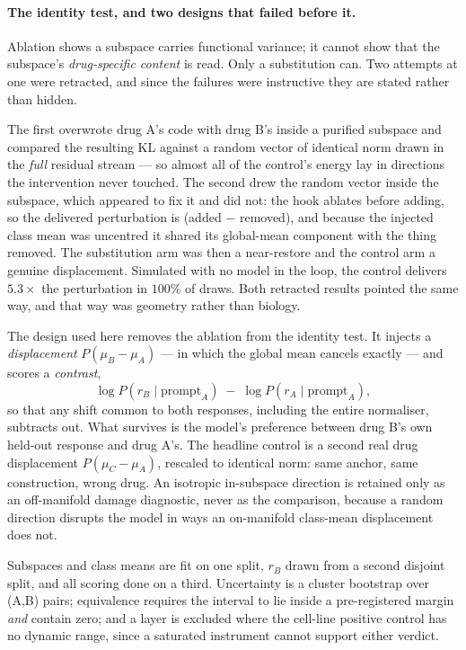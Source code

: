 \paragraph{The identity test, and two designs that failed before it.} Ablation shows a subspace
carries functional variance; it cannot show that the subspace's \emph{drug-specific content} is read.
Only a substitution can. Two attempts at one were retracted, and since the failures were instructive
they are stated rather than hidden.

The first overwrote drug A's code with drug B's inside a purified subspace and compared the resulting
KL against a random vector of identical norm drawn in the \emph{full} residual stream --- so almost
all of the control's energy lay in directions the intervention never touched. The second drew the
random vector inside the subspace, which appeared to fix it and did not: the hook ablates before
adding, so the delivered perturbation is (added $-$ removed), and because the injected class mean was
uncentred it shared its global-mean component with the thing removed. The substitution arm was then
a near-restore and the control arm a genuine displacement. Simulated with no model in the loop, the
control delivers $5.3\times$ the perturbation in $100\%$ of draws. Both retracted results pointed the
same way, and that way was geometry rather than biology.

The design used here removes the ablation from the identity test. It injects a \emph{displacement}
$P(\mu_B - \mu_A)$ --- in which the global mean cancels exactly --- and scores a \emph{contrast},
\begin{equation}
  \log P\!\left(r_B \mid \textrm{prompt}_A\right) \;-\; \log P\!\left(r_A \mid \textrm{prompt}_A\right),
\end{equation}
so that any shift common to both responses, including the entire normaliser, subtracts out. What
survives is the model's preference between drug B's own held-out response and drug A's. The headline
control is a second real drug displacement $P(\mu_C - \mu_A)$, rescaled to identical norm: same
anchor, same construction, wrong drug. An isotropic in-subspace direction is retained only as an
off-manifold damage diagnostic, never as the comparison, because a random direction disrupts the
model in ways an on-manifold class-mean displacement does not.

Subspaces and class means are fit on one split, $r_B$ drawn from a second disjoint split, and all
scoring done on a third. Uncertainty is a cluster bootstrap over (A,B) pairs; equivalence requires
the interval to lie inside a pre-registered margin \emph{and} contain zero; and a layer is excluded
where the cell-line positive control has no dynamic range, since a saturated instrument cannot
support either verdict.

